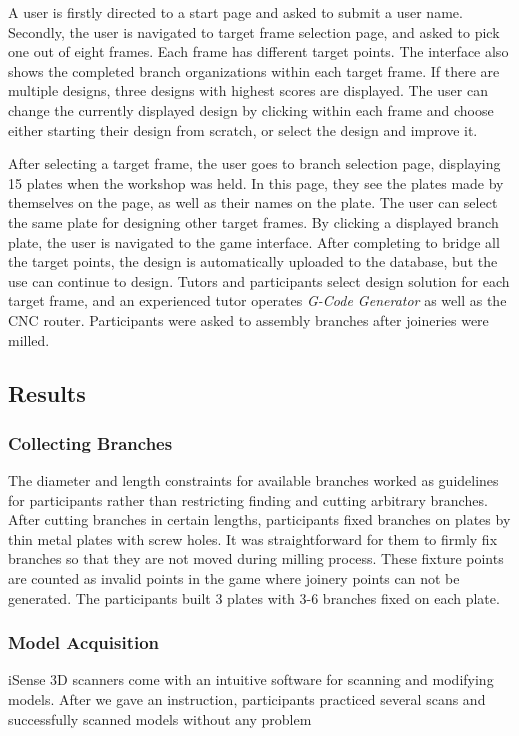 A user is firstly directed to a start page and asked to submit a user name.
Secondly, the user is navigated to target frame selection page, and asked to pick one out of eight frames.
Each frame has different target points.
The interface also shows the completed branch organizations within each target frame.
If there are multiple designs, three designs with highest scores are displayed.
The user can change the currently displayed design by clicking within each frame and choose either starting their design from scratch, or select the design and improve it.

After selecting a target frame, the user goes to branch selection page, displaying 15 plates when the workshop was held.
In this page, they see the plates made by themselves on the page, as well as their names on the plate.
The user can select the same plate for designing other target frames.
By clicking a displayed branch plate, the user is navigated to the game interface.
After completing to bridge all the target points, the design is automatically uploaded to the database, but the use can continue to design.
Tutors and participants select design solution for each target frame, and an experienced tutor operates \textit{G-Code Generator} as well as the CNC router.
Participants were asked to assembly branches after joineries were milled.

\subsection{Results}

\subsubsection*{Collecting Branches}
The diameter and length constraints for available branches worked as guidelines for participants rather than restricting finding and cutting arbitrary branches.
After cutting branches in certain lengths, participants fixed branches on plates by thin metal plates with screw holes.
It was straightforward for them to firmly fix branches so that they are not moved during milling process.
These fixture points are counted as invalid points in the game where joinery points can not be generated.
The participants built 3 plates with 3-6 branches fixed on each plate.

\subsubsection*{Model Acquisition}
iSense 3D scanners come with an intuitive software for scanning and modifying models.
After we gave an instruction, participants practiced several scans and successfully scanned models without any problem

